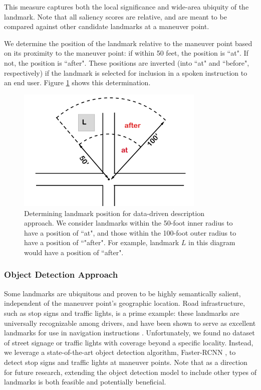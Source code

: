 This measure captures both the local significance and wide-area ubiquity of the landmark. Note that all saliency scores are relative, and are meant to be compared against other candidate landmarks at a maneuver point.

We determine the position of the landmark relative to the maneuver point based on its proximity to the maneuver point: if within 50 feet, the position is ``at". If not, the position is ``after". These positions are inverted (into ``at" and ``before", respectively) if the landmark is selected for inclusion in a spoken instruction to an end user. Figure \ref{fig:positions} shows this determination.

\begin{figure}[htbp]
  \centering
  \includegraphics[width=0.8\textwidth]{images/positions.pdf}
  \caption{Determining landmark position for data-driven description approach. We consider landmarks within the 50-foot inner radius to have a position of ``at", and those within the 100-foot outer radius to have a position of ``"after". For example, landmark $L$ in this diagram would have a position of ``after".}
  \label{fig:positions}
\end{figure}

\subsubsection{Object Detection Approach}
Some landmarks are ubiquitous and proven to be highly semantically salient, independent of the maneuver point's geographic location. Road infrastructure, such as stop signs and traffic lights, is a prime example: these landmarks are universally recognizable among drivers, and have been shown to serve as excellent landmarks for use in navigation instructions \cite{may_ross_bayer_2005}. Unfortunately, we found no dataset of street signage or traffic lights with coverage beyond a specific locality. Instead, we leverage a state-of-the-art object detection algorithm, Faster-RCNN \cite{ren2015faster}, to detect stop signs and traffic lights at maneuver points. Note that as a direction for future research, extending the object detection model to include other types of landmarks is both feasible and potentially beneficial.


